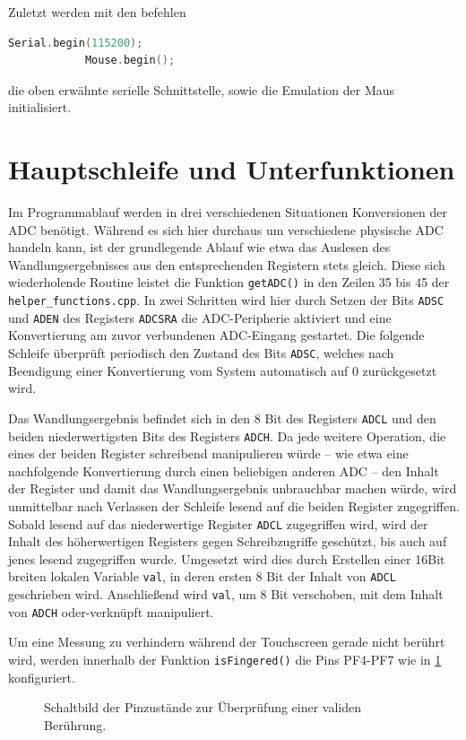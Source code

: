 		Zuletzt werden mit den befehlen
		\begin{lstlisting}[language=C++]
			Serial.begin(115200);
			Mouse.begin();
		\end{lstlisting}
		die oben erwähnte serielle Schnittstelle, sowie die Emulation der Maus initialisiert.

	\section{Hauptschleife und Unterfunktionen}
		Im Programmablauf werden in drei verschiedenen Situationen Konversionen der ADC benötigt.
		Während es sich hier durchaus um verschiedene physische ADC handeln kann, ist der grundlegende Ablauf wie etwa das Auslesen des Wandlungsergebnisses aus den entsprechenden Registern stets gleich.
		Diese sich wiederholende Routine leistet die Funktion \texttt{getADC()} in den Zeilen 35 bis 45 der \texttt{helper\_functions.cpp}.
		In zwei Schritten wird hier durch Setzen der Bits \texttt{ADSC} und \texttt{ADEN} des Registers \texttt{ADCSRA} die ADC-Peripherie aktiviert und eine Konvertierung am zuvor verbundenen ADC-Eingang gestartet.
		Die folgende Schleife überprüft periodisch den Zustand des Bits \texttt{ADSC}, welches nach Beendigung einer Konvertierung vom System automatisch auf 0 zurückgesetzt wird.\par
		Das Wandlungsergebnis befindet sich in den 8 Bit des Registers \texttt{ADCL} und den beiden niederwertigsten Bits des Registers \texttt{ADCH}.
		Da jede weitere Operation, die eines der beiden Register schreibend manipulieren würde -- wie etwa eine nachfolgende Konvertierung durch einen beliebigen anderen ADC -- den Inhalt der Register und damit das Wandlungsergebnis unbrauchbar machen würde, wird unmittelbar nach Verlassen der Schleife lesend auf die beiden Register zugegriffen.
		Sobald lesend auf das niederwertige Register \texttt{ADCL} zugegriffen wird, wird der Inhalt des höherwertigen Registers gegen Schreibzugriffe geschützt, bis auch auf jenes lesend zugegriffen wurde.
		Umgesetzt wird dies durch Erstellen einer 16Bit breiten lokalen Variable \texttt{val}, in deren ersten 8 Bit der Inhalt von \texttt{ADCL} geschrieben wird.
		Anschließend wird \texttt{val}, um 8 Bit verschoben, mit dem Inhalt von \texttt{ADCH} oder-verknüpft manipuliert.
		

		Um eine Messung zu verhindern während der Touchscreen gerade nicht berührt wird, werden innerhalb der Funktion \texttt{isFingered()} die Pins PF4-PF7 wie in \cref{fig:fingered} konfiguriert.
		\begin{figure}[h]
			\centering
			
			\caption{Schaltbild der Pinzustände zur Überprüfung einer validen Berührung.}
			\label{fig:fingered}
		\end{figure}